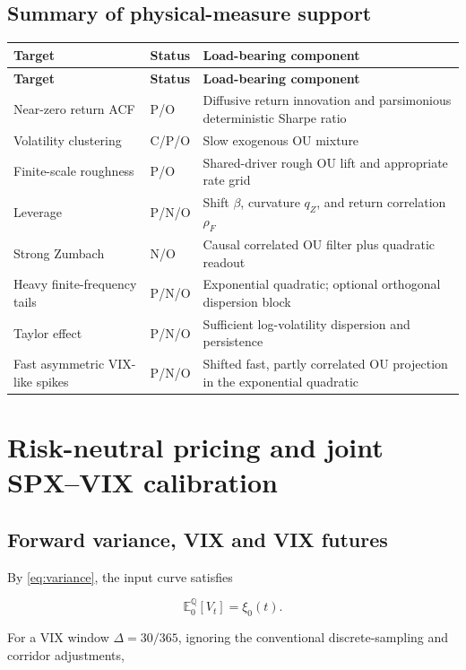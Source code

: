 \documentclass[11pt,a4paper]{article}
\newcommand{\Qq}{\mathbb{Q}}
\newcommand{\E}{\mathbb{E}}
\begin{document}
\subsection{Summary of physical-measure support}

\begin{longtable}{@{}L{34mm}C{20mm}L{88mm}@{}}
\toprule
\textbf{Target} & \textbf{Status} & \textbf{Load-bearing component} \\
\midrule
\endfirsthead
\toprule
\textbf{Target} & \textbf{Status} & \textbf{Load-bearing component} \\
\midrule
\endhead
Near-zero return ACF & P/O & Diffusive return innovation and parsimonious deterministic Sharpe ratio \\
Volatility clustering & C/P/O & Slow exogenous OU mixture \\
Finite-scale roughness & P/O & Shared-driver rough OU lift and appropriate rate grid \\
Leverage & P/N/O & Shift \(\beta\), curvature \(q_Z\), and return correlation \(\rho_F\) \\
Strong Zumbach & N/O & Causal correlated OU filter plus quadratic readout \\
Heavy finite-frequency tails & P/N/O & Exponential quadratic; optional orthogonal dispersion block \\
Taylor effect & P/N/O & Sufficient log-volatility dispersion and persistence \\
Fast asymmetric VIX-like spikes & P/N/O & Shifted fast, partly correlated OU projection in the exponential quadratic \\
\bottomrule
\end{longtable}

\section{Risk-neutral pricing and joint SPX--VIX calibration}

\subsection{Forward variance, VIX and VIX futures}

By \cref{eq:variance}, the input curve satisfies

\begin{equation}
\E_0^{\Qq}[V_t]=\xi_0(t).
\end{equation}

For a VIX window \(\Delta=30/365\), ignoring the conventional discrete-sampling and corridor
adjustments,
\end{document}
